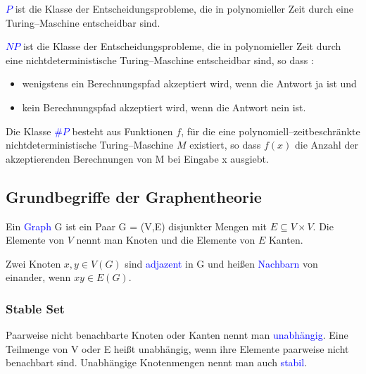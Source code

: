 \begin{definition}
\textcolor{blue}{$P$} ist die Klasse der Entscheidungsprobleme, die in polynomieller Zeit durch eine Turing--Maschine entscheidbar sind. \cite{Kompl1}
\end{definition}

\begin{definition}
\textcolor{blue}{$NP$} ist die Klasse der Entscheidungsprobleme, die in polynomieller Zeit durch eine nichtdeterministische Turing--Maschine entscheidbar sind, so dass \citep{Kompl1} :
\begin{itemize}
\item wenigstens ein Berechnungspfad akzeptiert wird, wenn die Antwort \glqq ja\grqq{}  ist und
\item kein Berechnungspfad akzeptiert wird, wenn die Antwort \glqq nein\grqq{} ist.
\end{itemize} 
\end{definition}

\begin{definition}
Die Klasse \textcolor{blue}{$\#P$} besteht aus Funktionen $f$, für die eine polynomiell--zeitbeschränkte nichtdeterministische Turing--Maschine $M$ existiert, so dass $f(x)$ die Anzahl der akzeptierenden Berechnungen von M bei Eingabe x ausgiebt. \citep{Kompl2}
\end{definition}


\subsection{Grundbegriffe der Graphentheorie} 

\begin{definition}
Ein \textcolor{blue}{Graph} G ist ein Paar G = (V,E) disjunkter Mengen mit $E \subseteq V\times V$. Die Elemente von $V$ nennt man Knoten und die Elemente von $E$ Kanten. \cite{Diestel}
\end{definition}

\begin{definition}
Zwei Knoten $x,y \in V(G)$ sind \textcolor{blue}{adjazent} in G und heißen \textcolor{blue}{Nachbarn} von einander, wenn $xy \in E(G)$. \cite{Diestel}
\end{definition}

\subsubsection*{Stable Set}

\begin{definition}
Paarweise nicht benachbarte Knoten oder Kanten nennt man \textcolor{blue}{unabhängig}. Eine Teilmenge von V oder E heißt unabhängig, wenn ihre Elemente paarweise nicht benachbart sind. Unabhängige Knotenmengen nennt man auch \textcolor{blue}{stabil}. \cite{Diestel}
\end{definition}

